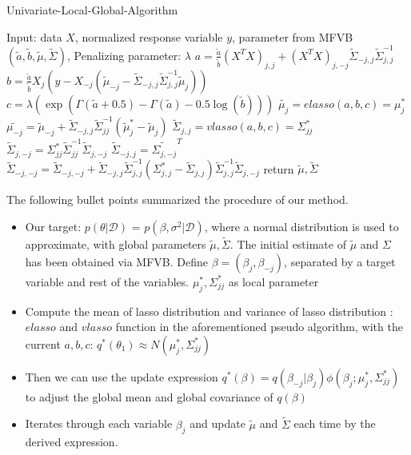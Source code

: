 \newpage
\begin{algorithm}
	\caption{Univariate-Local-Global-Algorithm}
	\begin{algorithmic}[1]
		
    \State Input: data $X$, normalized response variable $y$, parameter from MFVB $(\tilde{a},\tilde{b},\tilde{\mu},\tilde{\Sigma})$, Penalizing parameter: $\lambda$
	\State $a = \frac{\tilde{a}}{\tilde{b}}(X^TX)_{j,j} + (X^TX)_{j,-j}\tilde{\Sigma}_{-j,j}\tilde{\Sigma}_{j,j}^{-1}$ 
	\State $b = \frac{\tilde{a}}{\tilde{b}}  X_{j}(y-X_{-j}(\tilde{\mu}_{-j} - \tilde{\Sigma}_{-j,j}\tilde{\Sigma}_{j,j}^{-1}\tilde{\mu}_j))       $ 
	\State $c = \lambda (\exp(\Gamma(\tilde{a}+0.5) - \Gamma(\tilde{a}) - 0.5\log(\tilde{b})))  $ 
	\State $\tilde{\mu_{j}} =  elasso(a,b,c) = \mu_j ^*$ 
	\State $\tilde{\mu_{-j}} = \tilde{\mu}_{-j} +  \tilde{\Sigma}_{-j,j}\tilde{\Sigma}^{-1}_{jj}(\tilde{\mu}_j^*-\tilde{\mu}_j)$ 
	\State $\tilde{\Sigma}_{j,j} = vlasso(a,b,c) = \Sigma_{jj}^*$ 
	\State $\tilde{\Sigma}_{j,-j} = \Sigma_{jj}^*  \tilde{\Sigma}_{jj}^{-1}\tilde{\Sigma}_{j,-j} $ 
	\State $\tilde{\Sigma}_{-j,j} = \tilde{\Sigma_{j,-j}}^T$ 
	\State $\tilde{\Sigma}_{-j,-j} = \tilde{\Sigma}_{-j,-j} + \tilde{\Sigma}_{-j,j}\tilde{\Sigma}_{j,j}^{-1}(\Sigma_{j,j}^{*} - \tilde{\Sigma}_{j,j})\tilde{\Sigma}_{j,j}^{-1}\tilde{\Sigma}_{j,-j}$ 		
	\EndFor
	\EndWhile
	\State return $\tilde{\mu},\tilde{\Sigma}$
	\end{algorithmic}
\end{algorithm}


The following bullet points summarized the procedure of our method.
\begin{itemize}
	\item Our target: $p(\theta|\mathcal{D})$ = $p(\beta, \sigma^2|\mathcal{D})$, where a normal distribution is used to approximate, with global parameters $\tilde{\mu},\tilde{\Sigma}$. The initial estimate of $\tilde{\mu}$ and $\Sigma$ has been obtained via MFVB. Define $\beta = (\beta_j,\beta_{-j})$, separated by a target variable and rest of the variables. $\mu_{j}^*, \Sigma_{jj}^*$ as local parameter
	
	
	\item Compute the mean of lasso distribution and variance of lasso distribution : $elasso$ and $vlasso$ function in the aforementioned pseudo algorithm, with the current $a,b,c$: $q^*(\theta_1) \approx N(\mu_j^*,\Sigma_{jj}^*)$
	\item Then we can use the update expression $q^*(\beta) = q(\beta_{-j}|\beta_j)\phi(\beta_j;\mu_j^*,\Sigma_{jj}^*)$ to adjust the global mean and global covariance of $q(\beta)$
	\item Iterates through each variable $\beta_j$ and update $\tilde{\mu}$ and $\tilde{\Sigma}$ each time by the derived expression.
\end{itemize}

